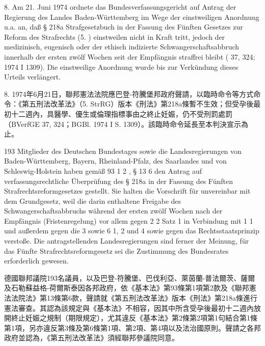 \documentclass[12pt]{article}
\begin{document}
\syncleft
\begin{sourcepara}
8. Am 21. Juni 1974 ordnete das Bundesverfassungsgericht auf Antrag der Regierung des Landes Baden-Württemberg im Wege der einstweiligen Anordnung u.a. an, daß § 218a Strafgesetzbuch in der Fassung des Fünften Gesetzes zur Reform des Strafrechts (5. \abbrStrRG{}) einstweilen nicht in Kraft tritt, jedoch der medizinisch, eugenisch oder der ethisch indizierte Schwangerschaftsabbruch innerhalb der ersten zwölf Wochen seit der Empfängnis straffrei bleibt (\abbrBVerfGE{} 37, 324; \abbrBGBl{} 1974 I \abbrS{} 1309). Die einstweilige Anordnung wurde bis zur Verkündung dieses Urteils verlängert.
\end{sourcepara}
\begin{transpara}
8. 1974年6月21日，聯邦憲法法院應巴登-符騰堡邦政府聲請，以臨時命令等方式命令：《第五刑法改革法》（5. StrRG）版本《刑法》第218a條暫不生效；但受孕後最初十二週內，具醫學、優生或倫理指標事由之終止妊娠，仍不受刑罰處罰（BVerfGE 37, 324；BGBl. 1974 I S. 1309）。該臨時命令延長至本判決宣示為止。
\end{transpara}

\syncleft
\begin{sourcepara}
193 Mitglieder des Deutschen Bundestages sowie die Landesregierungen von Baden-Württemberg, Bayern, Rheinland-Pfalz, des Saarlandes und von Schleswig-Holstein haben gemäß \abbrArt{} 93 \abbrAbs{} 1 \abbrNr{} 2 \abbrGG{}\ggfnArtNineThreeOneTwoDE{}, § 13 \abbrNr{} 6 \abbrBVerfGG{} den Antrag auf verfassungsrechtliche Überprüfung des § 218a \abbrStGB{} in der Fassung des Fünften Strafrechtsreformgesetzes gestellt. Sie halten die Vorschrift für unvereinbar mit dem Grundgesetz, weil die darin enthaltene Freigabe des Schwangerschaftsabbruchs während der ersten zwölf Wochen nach der Empfängnis (Fristenregelung) vor allem gegen \abbrArt{} 2 \abbrAbs{} 2 Satz 1 in Verbindung mit \abbrArt{} 1 \abbrAbs{} 1 \abbrGG{}\ggfnLifeDignityDE{} und außerdem gegen die \abbrArt{} 3 sowie 6 \abbrAbs{} 1, 2 und 4 \abbrGG{}\ggfnArtThreeSixDE{} sowie gegen das Rechtsstaatsprinzip verstoße. Die antragstellenden Landesregierungen sind ferner der Meinung, für das Fünfte Strafrechtsreformgesetz sei die Zustimmung des Bundesrates erforderlich gewesen.
\end{sourcepara}
\begin{transpara}
德國聯邦議院193名議員，以及巴登-符騰堡、巴伐利亞、萊茵蘭-普法爾茨、薩爾及石勒蘇益格-荷爾斯泰因各邦政府，依《基本法》第93條第1項第2款\ggfnArtNineThreeOneTwoZH{}及《聯邦憲法法院法》第13條第6款，聲請就《第五刑法改革法》版本《刑法》第218a條進行憲法審查。其認為該規定與《基本法》不相容，因其中所含受孕後最初十二週內放開終止妊娠之規制（期限規定），尤其違反《基本法》第2條第2項第1句結合第1條第1項\ggfnLifeDignityZH{}，另亦違反第3條及第6條第1項、第2項、第4項\ggfnArtThreeSixZH{}以及法治國原則。聲請之各邦政府並認為，《第五刑法改革法》須經聯邦參議院同意。
\end{transpara}
\end{document}
